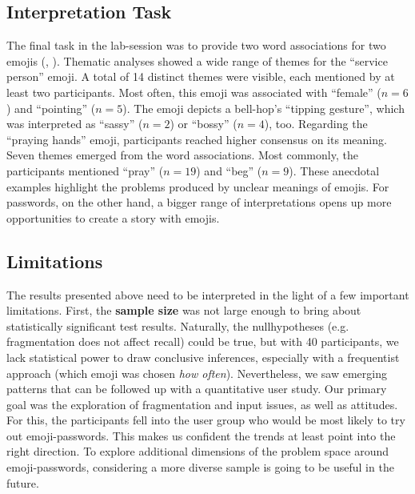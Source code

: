 \subsection{Interpretation Task}
The final task in the lab-session was to provide two word associations for two emojis (, ). Thematic analyses showed a wide range of themes for the ``service person'' emoji. A total of 14 distinct themes were visible, each mentioned by at least two participants. Most often, this emoji was associated with ``female'' ($n=6$) and ``pointing'' ($n=5$). The emoji depicts a bell-hop's ``tipping gesture'', which was interpreted as ``sassy'' ($n=2$) or ``bossy'' ($n=4$), too. Regarding the ``praying hands'' emoji, participants reached higher consensus on its meaning. Seven themes emerged from the word associations. Most commonly, the participants mentioned ``pray'' ($n=19$) and ``beg'' ($n=9$). These anecdotal examples highlight the problems produced by unclear meanings of emojis. For passwords, on the other hand, a bigger range of interpretations opens up more opportunities to create a story with emojis.

\subsection{Limitations}
The results presented above need to be interpreted in the light of a few important limitations. First, the \textbf{sample size} was not large enough to bring about statistically significant test results. Naturally, the nullhypotheses (e.g. fragmentation does not affect recall) could be true, but with 40 participants, we lack statistical power to draw conclusive inferences, especially with a frequentist approach (which emoji was chosen \textit{how often}). Nevertheless, we saw emerging patterns that can be followed up with a quantitative user study. Our primary goal was the exploration of fragmentation and input issues, as well as attitudes. For this, the participants fell into the user group who would be most likely to try out emoji-passwords. This makes us confident the trends at least point into the right direction. To explore additional dimensions of the problem space around emoji-passwords, considering a more diverse sample is going to be useful in the future.

